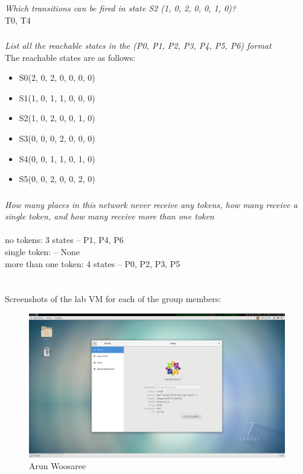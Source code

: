 \documentclass[letterpaper]{article}
\begin{document}
\subsubsection{}
\textit{Which transitions can be fired in state S2 (1, 0, 2, 0, 0, 1, 0)?}\\

T0, T4

\subsubsection{}
\textit{List all the reachable states in the (P0, P1, P2, P3, P4, P5, P6) format}\\

The reachable states are as follows:
\begin{itemize}
 \item S0(2, 0, 2, 0, 0, 0, 0)
 \item S1(1, 0, 1, 1, 0, 0, 0)
 \item S2(1, 0, 2, 0, 0, 1, 0)
 \item S3(0, 0, 0, 2, 0, 0, 0)
 \item S4(0, 0, 1, 1, 0, 1, 0)
 \item S5(0, 0, 2, 0, 0, 2, 0)
\end{itemize}

\subsubsection{}
\textit{How many places in this network never receive any tokens, how many receive a single token, and how many receive more than one token}\\
\noindent\\
no tokens: 3 states -- P1, P4, P6\\
single token: -- None\\
more than one token: 4 states -- P0, P2, P3, P5\\


\section{}

Screenshots of the lab VM for each of the group members:

\begin{figure}[H]
 \centering
 \includegraphics[width=\textwidth]{arun.png}
 \caption{Arun Woosaree}
\end{figure}
\end{document}
